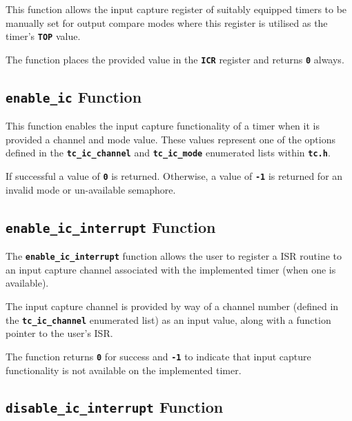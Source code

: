 \documentclass[a4paper, oneside, 11pt, titlepage, onecolumn, openright]{report}
\begin{document}
					This function allows the input capture register of suitably equipped timers to be manually set for output compare modes where this register is utilised as the timer's \textbf{\texttt{TOP}} value.
			
The function places the provided value in the \textbf{\texttt{ICR}} register and returns \textbf{\texttt{0}} always.
			
				\subsection{\textbf{\texttt{enable\_ic}} Function}
					\label{ss:Hardware Abstraction Libraries:tc Module:enable_ic Function}
			
					This function enables the input capture functionality of a timer when it is provided a channel and mode value. These values represent one of the options defined in the \textbf{\texttt{tc\_ic\_channel}} and \textbf{\texttt{tc\_ic\_mode}} enumerated lists within \textbf{\texttt{tc.h}}.
			
If successful a value of \textbf{\texttt{0}} is returned. Otherwise, a value of \textbf{\texttt{-1}} is returned for an invalid mode or un-available semaphore.
			
				\subsection{\textbf{\texttt{enable\_ic\_interrupt}} Function}
					\label{ss:Hardware Abstraction Libraries:tc Module:enable_ic_interrupt Function}
			
					The \textbf{\texttt{enable\_ic\_interrupt}} function allows the user to register a ISR routine to an input capture channel associated with the implemented timer (when one is available).
			
The input capture channel is provided by way of a channel number (defined in the \textbf{\texttt{tc\_ic\_channel}} enumerated list) as an input value, along with a function pointer to the user's ISR.			
			
The function returns \textbf{\texttt{0}} for success and \textbf{\texttt{-1}} to indicate that input capture functionality is not available on the implemented timer.	
			
				\subsection{\textbf{\texttt{disable\_ic\_interrupt}} Function}
					\label{ss:Hardware Abstraction Libraries:tc Module:disable_ic_interrupt Function}
			
\end{document}
